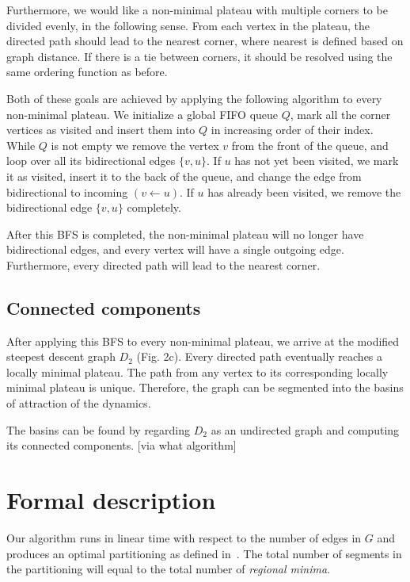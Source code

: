 \documentclass{article}\usepackage{times}
\begin{document}
Furthermore, we would like a non-minimal plateau with multiple corners
to be divided evenly, in the following sense.  From each vertex in the
plateau, the directed path should lead to the nearest corner, where
nearest is defined based on graph distance.  If there is a tie between
corners, it should be resolved using the same ordering function as before. 

Both of these goals are achieved by applying the following algorithm
to every non-minimal plateau.  We initialize a global FIFO queue $Q$,
mark all the corner vertices as visited and insert them into $Q$ in
increasing order of their index. While $Q$ is not empty we remove the
vertex $v$ from the front of the queue, and loop over all its
bidirectional edges $\{v,u\}$.  If $u$ has not yet been visited, we
mark it as visited, insert it to the back of the queue, and change the
edge from bidirectional to incoming $(v\leftarrow u)$. If $u$ has
already been visited, we remove the bidirectional edge $\{v,u\}$
completely.

After this BFS is completed, the non-minimal plateau will no longer
have bidirectional edges, and every vertex will have a single outgoing
edge.  Furthermore, every directed path will lead to the nearest
corner.

\subsection{Connected components}
After applying this BFS to every non-minimal plateau, we arrive at the
modified steepest descent graph $D_2$ (Fig. 2c).  Every directed path eventually reaches a locally minimal plateau.  The path from any vertex to its corresponding locally minimal plateau is unique.  Therefore, the graph can be segmented into the basins of attraction of the dynamics.

The basins can be found by regarding $D_2$ as an undirected graph and
computing its connected components.  [via what algorithm]

\section{Formal description}
Our algorithm runs in linear time with respect to the number of edges
in $G$ and produces an optimal partitioning as defined
in~\cite{Cousty2009}. The total number of segments in the partitioning
will equal to the total number of \emph{regional minima}.

\end{document}
